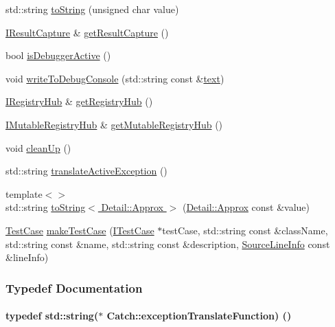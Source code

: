 \begin{DoxyCompactItemize}
\item 
std\+::string \hyperlink{a00117_a5d83eaeb68579a556c86cc05f7a7765f}{to\+String} (unsigned char value)
\item 
\hyperlink{a00040}{I\+Result\+Capture} \& \hyperlink{a00117_aff60c1de6ac6cea30175d70e33d83c8e}{get\+Result\+Capture} ()
\item 
bool \hyperlink{a00117_ab079497368fb1df25af39ad494d2a241}{is\+Debugger\+Active} ()
\item 
void \hyperlink{a00117_aa5dcf4750ce9a854f4b74d3c952d13cc}{write\+To\+Debug\+Console} (std\+::string const \&\hyperlink{a00114_ac3ed6ea030e1a1d6234b110347cad11e}{text})
\item 
\hyperlink{a00039}{I\+Registry\+Hub} \& \hyperlink{a00117_ac24b072979540bfd922e7d46e899f46f}{get\+Registry\+Hub} ()
\item 
\hyperlink{a00038}{I\+Mutable\+Registry\+Hub} \& \hyperlink{a00117_ac9ddcc6d66079add9cb2a3140b8ae51e}{get\+Mutable\+Registry\+Hub} ()
\item 
void \hyperlink{a00117_a0f78e9afdebc6d4512d18e76fbf54b8c}{clean\+Up} ()
\item 
std\+::string \hyperlink{a00117_adafff91485eeeeb9e9333f317cc0e3b1}{translate\+Active\+Exception} ()
\item 
{\footnotesize template$<$$>$ }\\std\+::string \hyperlink{a00117_ac501c2b6bfe82978d699ddda37c53d13}{to\+String$<$ Detail\+::\+Approx $>$} (\hyperlink{a00003}{Detail\+::\+Approx} const \&value)
\item 
\hyperlink{a00085}{Test\+Case} \hyperlink{a00117_a2a784590bb5068810d3f6013fed1f1d3}{make\+Test\+Case} (\hyperlink{a00045}{I\+Test\+Case} $\ast$test\+Case, std\+::string const \&class\+Name, std\+::string const \&name, std\+::string const \&description, \hyperlink{a00075}{Source\+Line\+Info} const \&line\+Info)
\end{DoxyCompactItemize}


\subsubsection{Typedef Documentation}
\hypertarget{a00117_a14edb319150d3e108bbdef994f9eec2a}{}
\paragraph[{exception\+Translate\+Function}]{\setlength{\rightskip}{0pt plus 5cm}typedef std\+::string($\ast$ Catch\+::exception\+Translate\+Function) ()}\label{a00117_a14edb319150d3e108bbdef994f9eec2a}


